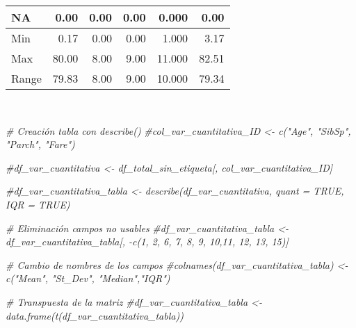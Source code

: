 \documentclass[
]{article}
\newenvironment{Shaded}{\begin{snugshade}}{\end{snugshade}}
\newcommand{\CommentTok}[1]{\textcolor[rgb]{0.56,0.35,0.01}{\textit{#1}}}
\begin{document}
\begin{table}
\begin{tabular}[t]{l|r|r|r|r|r}
\hline
\hspace{1em}NA & 0.00 & 0.00 & 0.00 & 0.000 & 0.00\\
\hline
\hspace{1em}Min & 0.17 & 0.00 & 0.00 & 1.000 & 3.17\\
\hline
\hspace{1em}Max & 80.00 & 8.00 & 9.00 & 11.000 & 82.51\\
\hline
\hspace{1em}Range & 79.83 & 8.00 & 9.00 & 10.000 & 79.34\\
\hline
\end{tabular}
\end{table}

\texttt{}~\\
\texttt{}

\begin{Shaded}
\begin{Highlighting}[]
\CommentTok{# Creación tabla con describe()}
\CommentTok{#col_var_cuantitativa_ID <- c("Age", "SibSp", "Parch", "Fare")}

\CommentTok{#df_var_cuantitativa <- df_total_sin_etiqueta[, col_var_cuantitativa_ID]}

\CommentTok{#df_var_cuantitativa_tabla <- describe(df_var_cuantitativa, quant = TRUE, IQR = TRUE)}

\CommentTok{# Eliminación campos no usables}
\CommentTok{#df_var_cuantitativa_tabla <- df_var_cuantitativa_tabla[, -c(1, 2, 6, 7, 8, 9, 10,11, 12, 13, 15)]}

\CommentTok{# Cambio de nombres de los campos}
\CommentTok{#colnames(df_var_cuantitativa_tabla) <- c("Mean", "St_Dev", "Median","IQR")}

\CommentTok{# Transpuesta de la matriz}
\CommentTok{#df_var_cuantitativa_tabla <- data.frame(t(df_var_cuantitativa_tabla))}
\end{Highlighting}
\end{Shaded}

\texttt{}~\\
\texttt{}
\end{document}
